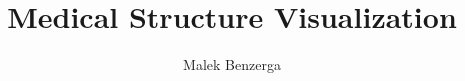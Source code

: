\documentclass[12pt, a4paper]{report}
\title{Medical Structure Visualization}
\author{Malek Benzerga}
\begin{document}






\tableofcontents
\listoffigures
\listoftables 
\printglossary 








\end{document}
